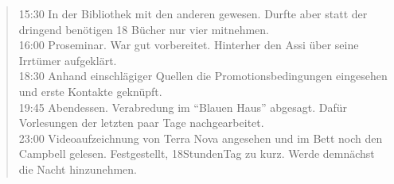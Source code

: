 \begin{verse}
15:30 In der Bibliothek mit den anderen gewesen. Durfte aber statt der dringend benötigen 18 Bücher nur vier mitnehmen.\\ 
16:00 Proseminar. War gut vorbereitet. Hinterher den Assi über seine Irrtümer aufgeklärt.\\ 
18:30 Anhand einschlägiger Quellen die Promotionsbedingungen eingesehen und erste Kontakte geknüpft.\\ 
19:45 Abendessen. Verabredung im "`Blauen Haus"' abgesagt. Dafür Vorlesungen der letzten paar Tage nachgearbeitet.\\ 
23:00 Videoaufzeichnung von Terra Nova angesehen und im Bett noch den Campbell gelesen. Festgestellt, 18\textminus{}Stunden\textminus{}Tag zu kurz. Werde demnächst die Nacht hinzunehmen.                                                                                                                                                                      \end{verse}

\newpage

